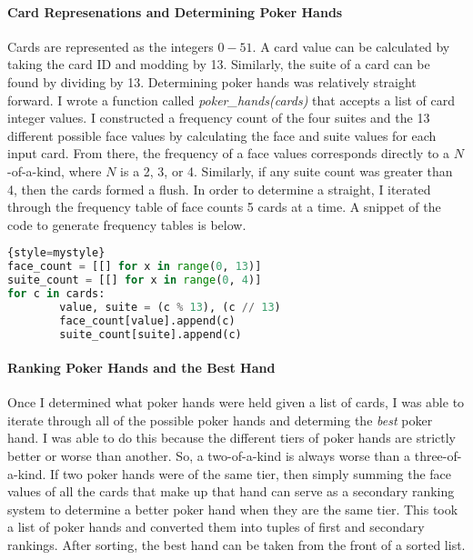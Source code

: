 \documentclass[10pt, a4paper, twocolumn]{article} %
\begin{document}
\paragraph{Card Represenations and Determining Poker Hands}
Cards are represented as the integers $0-51$. A card value can be calculated by taking the card ID and modding by 13. Similarly, the suite of a card can be found by dividing by 13. Determining poker hands was relatively straight forward. I wrote a function called \textit{poker\_hands(cards)} that accepts a list of card integer values. I constructed a frequency count of the four suites and the 13 different possible face values by calculating the face and suite values for each input card. From there, the frequency of a face values corresponds directly to a $N$-of-a-kind, where $N$ is a 2, 3, or 4. Similarly, if any suite count was greater than 4, then the cards formed a flush. In order to determine a straight, I iterated through the frequency table of face counts 5 cards at a time. A snippet of the code to generate frequency tables is below.

\begin{lstlisting}[language=Python]{style=mystyle}
face_count = [[] for x in range(0, 13)]
suite_count = [[] for x in range(0, 4)]
for c in cards:
		value, suite = (c % 13), (c // 13)
		face_count[value].append(c)
		suite_count[suite].append(c)
\end{lstlisting}

\paragraph{Ranking Poker Hands and the Best Hand}
Once I determined what poker hands were held given a list of cards, I was able to iterate through all of the possible poker hands and determing the \textit{best} poker hand. I was able to do this because the different tiers of poker hands are strictly better or worse than another. So, a two-of-a-kind is always worse than a three-of-a-kind. If two poker hands were of the same tier, then simply summing the face values of all the cards that make up that hand can serve as a secondary ranking system to determine a better poker hand when they are the same tier. This took a list of poker hands and converted them into tuples of first and secondary rankings. After sorting, the best hand can be taken from the front of a sorted list.
\end{document}
